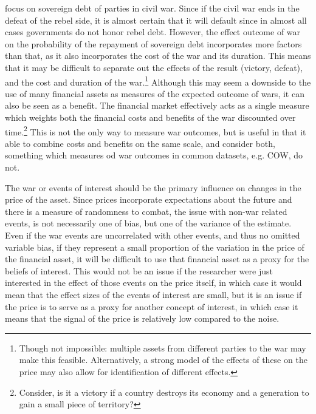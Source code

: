\textcite{HaberMitchenerOosterlinckEtAl2015} focus on sovereign debt of parties in civil war.
Since if the civil war ends in the defeat of the rebel side, it is almost certain that it will default since in almost all cases governments do not honor rebel debt.
However, the effect outcome of war on the probability of the repayment of sovereign debt incorporates more factors than that, as it also incorporates the cost of the war and its duration.
This means that it may be difficult to separate out the effects of the result (victory, defeat), and the cost and duration of the war.\footnote{
  Though not impossible: multiple assets from different parties to the war may make this feasible.
  Alternatively, a strong model of the effects of these on the price may also allow for identification of different effects.
}
Although this may seem a downside to the use of many financial assets as measures of the expected outcome of wars, it can also be seen as a benefit.
The financial market effectively acts as a single measure which weights both the financial costs and benefits of the war discounted over time.\footnote{
  Consider, is it a victory if a country destroys its economy and a generation to gain a small piece of territory?
}
This is not the only way to measure war outcomes, but is useful in that it able to combine costs and benefits on the same scale, and consider both, something which measures od war outcomes in common datasets, e.g. COW, do not.

The war or events of interest should be the primary influence on changes in the price of the asset.
Since prices incorporate expectations about the future and there is a measure of randomness to combat, the issue with non-war related events, is not necessarily one of bias, but one of the variance of the estimate.
Even if the war events are uncorrelated with other events, and thus no omitted variable bias, if they represent a small proportion of the variation in the price of the financial asset, it will be difficult to use that financial asset as a proxy for the beliefs of interest.
This would not be an issue if the researcher were just interested in the effect of those events on the price itself, in which case it would mean that the effect sizes of the events of interest are small, but it is an issue if the price is to serve as a proxy for another concept of interest, in which case it means that the signal of the price is relatively low compared to the noise.


